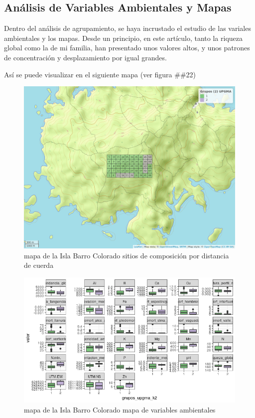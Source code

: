 \documentclass[11pt,]{article}
\begin{document}
\subsection{Análisis de Variables Ambientales y
Mapas}\label{anuxe1lisis-de-variables-ambientales-y-mapas}

Dentro del análisis de agrupamiento, se haya incrustado el estudio de
las variales ambientales y los mapas. Desde un principio, en este
artículo, tanto la riqueza global como la de mi familia, han presentado
unos valores altos, y unos patrones de concentración y desplazamiento
por igual grandes.

Así se puede visualizar en el siguiente mapa (ver figura \#\#22)

\begin{figure}
\centering
\includegraphics[width=1.00000\textwidth]{mapa_upgma_k2.png}
\caption{mapa de la Isla Barro Colorado sitios de composición por
distancia de cuerda \label{fig:bci_map}}
\end{figure}

\begin{figure}
\centering
\includegraphics[width=1.00000\textwidth]{mapas_variables_ambientales.png}
\caption{mapa de la Isla Barro Colorado mapa de variables ambientales
\label{fig:bci_map}}
\end{figure}
\end{document}
